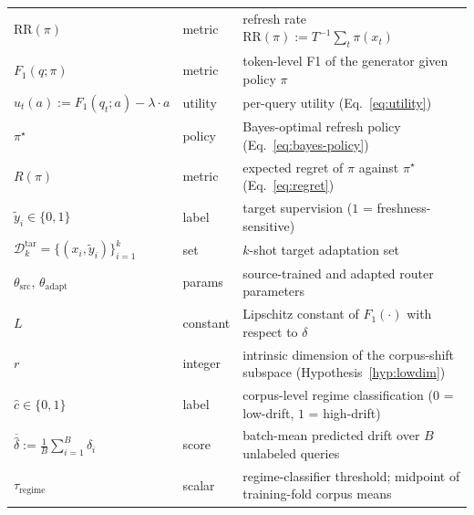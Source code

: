 \documentclass[pdflatex,sn-basic]{sn-jnl}
\begin{document}
\begin{table}[htbp]
\begin{tabular}{llp{9.4cm}}
$\mathrm{RR}(\pi)$ & metric & refresh rate $\mathrm{RR}(\pi) := T^{-1} \sum_{t} \pi(x_t)$ \\
$F_1(q; \pi)$ & metric & token-level F1 of the generator given policy $\pi$ \\
$u_t(a) := F_1(q_t; a) - \lambda \cdot a$ & utility & per-query utility (Eq.~\ref{eq:utility}) \\
$\pi^\star$ & policy & Bayes-optimal refresh policy (Eq.~\ref{eq:bayes-policy}) \\
$R(\pi)$ & metric & expected regret of $\pi$ against $\pi^\star$ (Eq.~\ref{eq:regret}) \\
$\tilde y_i \in \{0,1\}$ & label & target supervision ($1$ = freshness-sensitive) \\
$\mathcal{D}^{\mathrm{tar}}_k = \{(x_i, \tilde y_i)\}_{i=1}^{k}$ & set & $k$-shot target adaptation set \\
$\theta_{\mathrm{src}},\, \theta_{\mathrm{adapt}}$ & params & source-trained and adapted router parameters \\
$L$ & constant & Lipschitz constant of $F_1(\cdot)$ with respect to $\delta$ \\
$r$ & integer & intrinsic dimension of the corpus-shift subspace (Hypothesis~\ref{hyp:lowdim}) \\
$\hat c \in \{0,1\}$ & label & corpus-level regime classification ($0$ = low-drift, $1$ = high-drift) \\
$\overline{\hat\delta} := \frac{1}{B}\sum_{i=1}^{B} \hat\delta_i$ & score & batch-mean predicted drift over $B$ unlabeled queries \\
$\tau_{\mathrm{regime}}$ & scalar & regime-classifier threshold; midpoint of training-fold corpus means \\
\bottomrule
\end{tabular}
\end{table}
\end{document}
